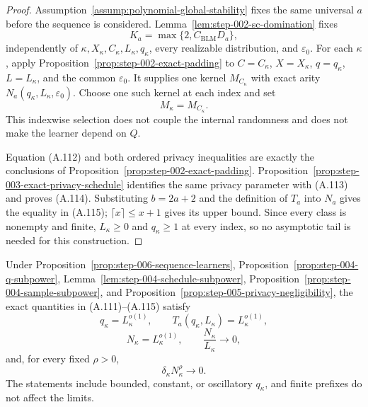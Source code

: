 \begin{proof}
Assumption~\ref{assump:polynomial-global-stability} fixes the same
universal \(a\) before the sequence is considered.
Lemma~\ref{lem:step-002-sc-domination} fixes
\[
K_a=\max\{2,C_{\mathrm{BLM}}D_a\},
\]
independently of
\(\kappa,X_\kappa,C_\kappa,L_\kappa,q_\kappa\), every realizable
distribution, and \(\varepsilon_0\).  For each \(\kappa\), apply
Proposition~\ref{prop:step-002-exact-padding} to
\(C=C_\kappa\), \(X=X_\kappa\), \(q=q_\kappa\),
\(L=L_\kappa\), and the common \(\varepsilon_0\).  It supplies one
kernel \(M_{C_\kappa}\) with exact arity
\(N_a(q_\kappa,L_\kappa,\varepsilon_0)\).  Choose one such kernel at
each index and set
\[
M_\kappa=M_{C_\kappa}.
\tag{A.116}
\]
This indexwise selection does not couple the internal randomness and
does not make the learner depend on \(Q\).

Equation (A.112) and both ordered privacy inequalities are exactly the
conclusions of Proposition~\ref{prop:step-002-exact-padding}.
Proposition~\ref{prop:step-003-exact-privacy-schedule} identifies the
same privacy parameter with (A.113) and proves (A.114).
Substituting \(b=2a+2\) and the definition of \(T_a\) into \(N_a\)
gives the equality in (A.115); \(\lceil x\rceil\leq x+1\) gives its
upper bound.  Since every class is nonempty and finite,
\(L_\kappa\geq0\) and \(q_\kappa\geq1\) at every index, so no
asymptotic tail is needed for this construction.
\end{proof}

\begin{proposition}
\label{prop:step-006-rate-certificates}
Under Proposition~\ref{prop:step-006-sequence-learners},
Proposition~\ref{prop:step-004-q-subpower},
Lemma~\ref{lem:step-004-schedule-subpower},
Proposition~\ref{prop:step-004-sample-subpower}, and
Proposition~\ref{prop:step-005-privacy-negligibility}, the exact
quantities in (A.111)--(A.115) satisfy
\[
q_\kappa=L_\kappa^{o(1)},\qquad
T_a(q_\kappa,L_\kappa)=L_\kappa^{o(1)},
\tag{A.117}
\]
\[
N_\kappa=L_\kappa^{o(1)},\qquad
\frac{N_\kappa}{L_\kappa}\longrightarrow0,
\tag{A.118}
\]
and, for every fixed \(\rho>0\),
\[
\delta_\kappa N_\kappa^\rho\longrightarrow0.
\tag{A.119}
\]
The statements include bounded, constant, or oscillatory
\(q_\kappa\), and finite prefixes do not affect the limits.
\end{proposition}

